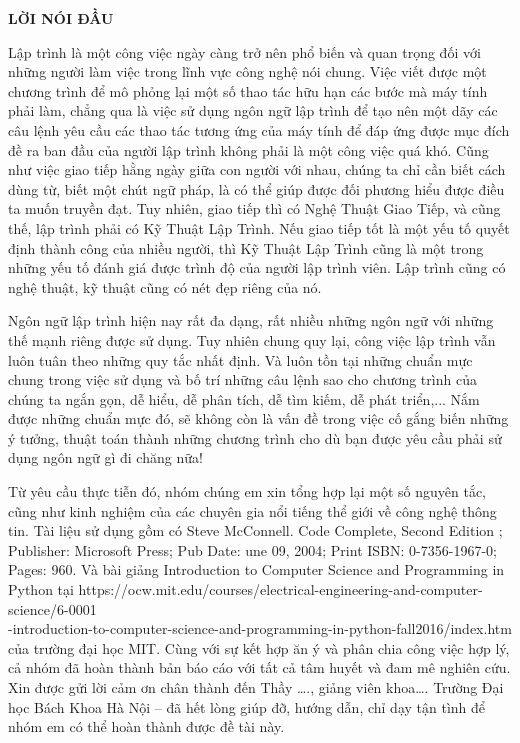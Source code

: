\documentclass[12pt]{report}
\begin{document}

\newpage
\setcounter{page}{1}
\begin{center}
\LARGE\bfseries LỜI NÓI ĐẦU
\end{center}

Lập trình là một công việc ngày càng trở nên phổ biến và quan trọng đối với những người làm việc trong lĩnh vực công nghệ nói chung. Việc viết được một chương trình để mô phỏng lại một số thao tác hữu hạn các bước mà máy tính phải làm, chẳng qua là việc sử dụng ngôn ngữ lập trình để tạo nên một dãy các câu lệnh yêu cầu các thao tác tương ứng của máy tính để đáp ứng được mục đích đề ra ban đầu của người lập trình không phải là một công việc quá khó. Cũng như việc giao tiếp hằng ngày giữa con người với nhau, chúng ta chỉ cần biết cách dùng từ, biết một chút ngữ pháp, là có thể giúp được đối phương hiểu được điều ta muốn truyền đạt. Tuy nhiên, giao tiếp thì có Nghệ Thuật Giao Tiếp, và cũng thế, lập trình phải có Kỹ Thuật Lập Trình. Nếu giao tiếp tốt là một yếu tố quyết định thành công của nhiều người, thì Kỹ Thuật Lập Trình cũng là một trong những yếu tố đánh giá được trình độ của người lập trình viên. Lập trình cũng có nghệ thuật, kỹ thuật cũng có nét đẹp riêng của nó. 

Ngôn ngữ lập trình hiện nay rất đa dạng, rất nhiều những ngôn ngữ với những thế mạnh riêng được sử dụng. Tuy nhiên chung quy lại, công việc lập trình vẫn luôn tuân theo những quy tắc nhất định. Và luôn tồn tại những chuẩn mực chung trong việc sử dụng và bố trí những câu lệnh sao cho chương trình của chúng ta ngắn gọn, dễ hiểu, dễ phân tích, dễ tìm kiếm, dễ phát triển,... Nắm được những chuẩn mực đó, sẽ không còn là vấn đề trong việc cố gắng biến những ý tưởng, thuật toán thành những chương trình cho dù bạn được yêu cầu phải sử dụng ngôn ngữ gì đi chăng nữa!

Từ yêu cầu thực tiễn đó, nhóm chúng em xin tổng hợp lại một số nguyên tắc, cũng như kinh nghiệm của các chuyên gia nổi tiếng thể giới về công nghệ thông tin. Tài liệu sử dụng gồm có Steve McConnell. Code Complete, Second Edition ; Publisher: Microsoft Press; Pub Date: une 09, 2004; Print ISBN: 0-7356-1967-0; Pages: 960. Và bài giảng Introduction to Computer Science and Programming in Python tại https://ocw.mit.edu/courses/electrical-engineering-and-computer-science/6-0001 \\
-introduction-to-computer-science-and-programming-in-python-fall2016/index.htm của trường đại học MIT. Cùng với sự kết hợp ăn ý và phân chia công việc hợp lý, cả nhóm đã hoàn thành bản báo cáo với tất cả tâm huyết và đam mê nghiên cứu. Xin được gửi lời cảm ơn chân thành đến Thầy …., giảng viên khoa…. Trường Đại học Bách Khoa Hà Nội – đã hết lòng giúp đỡ, hướng dẫn, chỉ dạy tận tình để nhóm em có thể hoàn thành được đề tài này.
\end{document}
